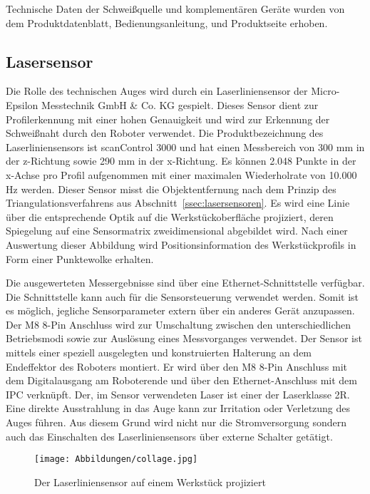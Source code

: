 Technische Daten der Schweißquelle und komplementären Geräte wurden von dem Produktdatenblatt, Bedienungsanleitung, und Produktseite erhoben.

\subsection{Lasersensor}

Die Rolle des technischen Auges wird durch ein Laserliniensensor der Micro-Epsilon Messtechnik GmbH \& Co. KG gespielt. Dieses Sensor dient zur Profilerkennung mit einer hohen Genauigkeit und wird zur Erkennung der Schweißnaht durch den Roboter verwendet. Die Produktbezeichnung des Laserliniensensors ist scanControl 3000 und hat einen Messbereich von 300 mm in der z-Richtung sowie 290 mm in der x-Richtung. Es können 2.048 Punkte in der x-Achse pro Profil aufgenommen mit einer maximalen Wiederholrate von 10.000 Hz werden. Dieser Sensor misst die Objektentfernung nach dem Prinzip des Triangulationsverfahrens aus Abschnitt~\ref{ssec:lasersensoren}. Es wird eine Linie über die entsprechende Optik auf die Werkstückoberfläche projiziert, deren Spiegelung auf eine Sensormatrix zweidimensional abgebildet wird. Nach einer Auswertung dieser Abbildung wird Positionsinformation des Werkstückprofils in Form einer Punktewolke erhalten. 

Die ausgewerteten Messergebnisse sind über eine Ethernet-Schnittstelle verfügbar. Die Schnittstelle kann auch für die Sensorsteuerung verwendet werden. Somit ist es möglich, jegliche Sensorparameter extern über ein anderes Gerät anzupassen. Der M8 8-Pin Anschluss wird zur Umschaltung zwischen den unterschiedlichen Betriebsmodi sowie zur Auslösung eines Messvorganges verwendet. Der Sensor ist mittels einer speziell ausgelegten und konstruierten Halterung an dem Endeffektor des Roboters montiert. Er wird über den M8 8-Pin Anschluss mit dem Digitalausgang am Roboterende und über den Ethernet-Anschluss mit dem IPC verknüpft. Der, im Sensor verwendeten Laser ist einer der Laserklasse 2R. Eine direkte Ausstrahlung in das Auge kann zur Irritation oder Verletzung des Auges führen. Aus diesem Grund wird nicht nur die Stromversorgung sondern auch das Einschalten des Laserliniensensors über externe Schalter getätigt.

\begin{figure}[h]
	\texttt{[image: Abbildungen/collage.jpg]}
	\centering
	\caption{Der Laserliniensensor auf einem Werkstück projiziert}
\end{figure}

